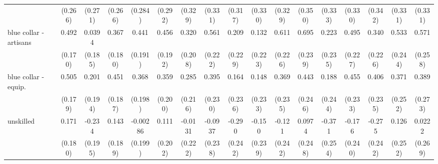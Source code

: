 {\begin{tabular}{l*{16}{c}}
                    &     (0.266)         &     (0.271)         &     (0.266)         &     (0.284)         &     (0.292)         &     (0.329)         &     (0.331)         &     (0.317)         &     (0.330)         &     (0.329)         &     (0.350)         &     (0.333)         &     (0.330)         &     (0.342)         &     (0.331)         &     (0.331)         \\
[1em]
blue collar - artisans&       0.492\sym{**} &      0.0394         &       0.367\sym{*}  &       0.441\sym{*}  &       0.456\sym{*}  &       0.320         &       0.561\sym{*}  &       0.209         &       0.132         &       0.611\sym{**} &       0.695\sym{**} &       0.223         &       0.495\sym{*}  &       0.340         &       0.533\sym{*}  &       0.571\sym{*}  \\
                    &     (0.170)         &     (0.185)         &     (0.180)         &     (0.191)         &     (0.192)         &     (0.208)         &     (0.222)         &     (0.229)         &     (0.223)         &     (0.226)         &     (0.239)         &     (0.235)         &     (0.227)         &     (0.226)         &     (0.244)         &     (0.258)         \\
[1em]
blue collar - equip.&       0.505\sym{**} &       0.201         &       0.451\sym{*}  &       0.368         &       0.359         &       0.285         &       0.395         &       0.164         &       0.148         &       0.369         &       0.443         &       0.188         &       0.455         &       0.406         &       0.371         &       0.389         \\
                    &     (0.179)         &     (0.194)         &     (0.187)         &     (0.198)         &     (0.200)         &     (0.216)         &     (0.230)         &     (0.236)         &     (0.233)         &     (0.235)         &     (0.246)         &     (0.244)         &     (0.233)         &     (0.235)         &     (0.252)         &     (0.273)         \\
[1em]
unskilled           &       0.171         &      -0.234         &       0.143         &    -0.00286         &       0.111         &     -0.0131         &     -0.0937         &      -0.290         &      -0.150         &      -0.121         &      0.0974         &      -0.371         &      -0.176         &      -0.275         &       0.126         &      0.0222         \\
                    &     (0.180)         &     (0.195)         &     (0.189)         &     (0.199)         &     (0.202)         &     (0.222)         &     (0.238)         &     (0.242)         &     (0.239)         &     (0.242)         &     (0.248)         &     (0.254)         &     (0.240)         &     (0.242)         &     (0.252)         &     (0.269)         \\

\end{tabular}}
